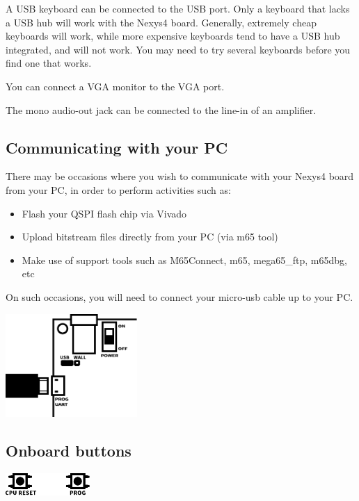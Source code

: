 A USB keyboard can be connected to the USB port. Only a keyboard that lacks a USB hub will work with the Nexys4 board.  Generally, extremely cheap keyboards will work, while more expensive keyboards tend to have a USB hub integrated, and will not work.  You may need to try several keyboards before you find one that works.

You can connect a VGA monitor to the VGA port.

The mono audio-out jack can be connected to the line-in of an amplifier.


\subsection{Communicating with your PC}

There may be occasions where you wish to communicate with your Nexys4 board from your PC, in order to perform activities such as:

\begin{itemize}
  \item Flash your QSPI flash chip via Vivado
  \item Upload bitstream files directly from your PC (via m65 tool)
  \item Make use of support tools such as M65Connect, m65, mega65\_ftp, m65dbg, etc
\end{itemize}

On such occasions, you will need to connect your micro-usb cable up to your PC.

\includegraphics[width=5cm]{images/illustrations/nexys-micro-usb-power.pdf}

\subsection{Onboard buttons}

\begin{center}
  \includegraphics[width=3.2cm]{images/illustrations/nexys-reset-buttons.pdf}
\end{center}

